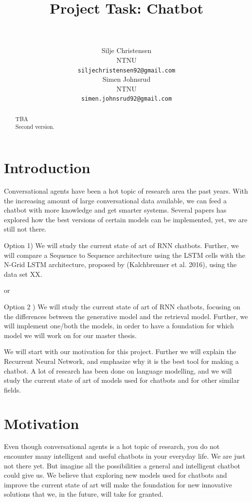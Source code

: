 \documentclass{article} %
\title{Project Task: Chatbot}
\author{
 \\
\texttt{} \\
\AND
Silje Christensen \\
NTNU \\
\texttt{siljechristensen92@gmail.com} \\
\And
Simen Johnsrud \\
NTNU \\
\texttt{simen.johnsrud92@gmail.com} \\
}
\begin{document}
\maketitle

\begin{abstract}
TBA\\
Second version.
\end{abstract}

\section{Introduction}
Conversational agents have been a hot topic of research area the past years. With the increasing amount of large conversational data available, we can feed a chatbot with more knowledge and get smarter systems. Several papers has explored how the best versions of certain models can be implemented, yet, we are still not there.

Option 1) We will study the current state of art of RNN chatbots. Further, we will compare a Sequence to Sequence architecture using the LSTM cells with the N-Grid LSTM architecture, proposed by (Kalchbrenner et al. 2016), using the data set XX. 

or

Option 2 ) We will study the current state of art of RNN chatbots, focusing on the differences between the generative model and the retrieval model. Further, we will implement one/both the models, in order to have a foundation for which model we will work on for our master thesis. 

We will start with our motivation for this project. Further we will explain the Recurrent Neural Network, and emphasize why it is the best tool for making a chatbot. A lot of research has been done on language modelling, and we will study the current state of art of models used for chatbots and for other similar fields. 

\section{Motivation}
Even though conversational agents is a hot topic of research, you do not encounter many intelligent and useful chatbots in your everyday life. We are just not there yet. But imagine all the possibilities a general and intelligent chatbot could give us. We believe that exploring new models used for chatbots and improve the current state of art will make the foundation for new innovative solutions that we, in the future, will take for granted. 
\end{document}

